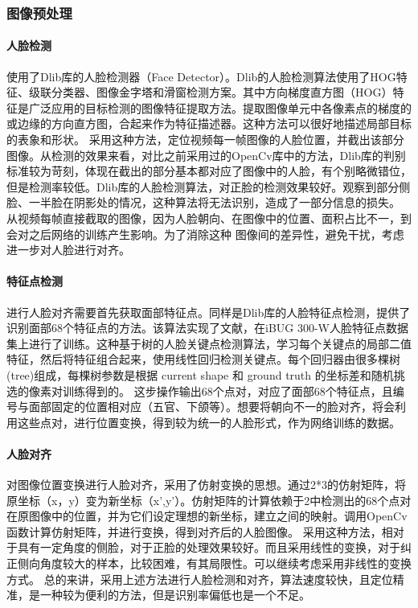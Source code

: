 \documentclass{article}
\begin{document}
\begin{multicols}{2}
            \subsubsection{图像预处理}
                \paragraph{人脸检测}
                    使用了Dlib库的人脸检测器（Face Detector）。Dlib的人脸检测算法使用了HOG特征、级联分类器、图像金字塔和滑窗检测方案。其中方向梯度直方图（HOG）特征是广泛应用的目标检测的图像特征提取方法。提取图像单元中各像素点的梯度的或边缘的方向直方图，合起来作为特征描述器。这种方法可以很好地描述局部目标的表象和形状。
                    采用这种方法，定位视频每一帧图像的人脸位置，并截出该部分图像。从检测的效果来看，对比之前采用过的OpenCv库中的方法，Dlib库的判别标准较为苛刻，体现在截出的部分基本都对应了图像中的人脸，有个别略微错位，但是检测率较低。Dlib库的人脸检测算法，对正脸的检测效果较好。观察到部分侧脸、一半脸在阴影处的情况，这种算法将无法识别，造成了一部分信息的损失。
                    从视频每帧直接截取的图像，因为人脸朝向、在图像中的位置、面积占比不一，到会对之后网络的训练产生影响。为了消除这种
                    图像间的差异性，避免干扰，考虑进一步对人脸进行对齐。

                \paragraph{特征点检测}
                    进行人脸对齐需要首先获取面部特征点。同样是Dlib库的人脸特征点检测，提供了识别面部68个特征点的方法。该算法实现了文献\cite{jose2014}，在iBUG 300-W人脸特征点数据集上进行了训练。这种基于树的人脸关键点检测算法，学习每个关键点的局部二值特征，然后将特征组合起来，使用线性回归检测关键点。每个回归器由很多棵树(tree)组成，每棵树参数是根据 current shape 和 ground truth 的坐标差和随机挑选的像素对训练得到的。
                    这步操作输出68个点对，对应了面部68个特征点，且编号与面部固定的位置相对应（五官、下颌等）。想要将朝向不一的脸对齐，将会利用这些点对，进行位置变换，得到较为统一的人脸形式，作为网络训练的数据。

                \paragraph{人脸对齐}
                    对图像位置变换进行人脸对齐，采用了仿射变换的思想。通过2*3的仿射矩阵，将原坐标（x，y）变为新坐标（x',y'）。仿射矩阵的计算依赖于2中检测出的68个点对在原图像中的位置，并为它们设定理想的新坐标，建立之间的映射。调用OpenCv函数计算仿射矩阵，并进行变换，得到对齐后的人脸图像。
                    采用这种方法，相对于具有一定角度的侧脸，对于正脸的处理效果较好。而且采用线性的变换，对于纠正侧向角度较大的样本，比较困难，有其局限性。可以继续考虑采用非线性的变换方式。
                    总的来讲，采用上述方法进行人脸检测和对齐，算法速度较快，且定位精准，是一种较为便利的方法，但是识别率偏低也是一个不足。

\end{multicols}
\end{document}
